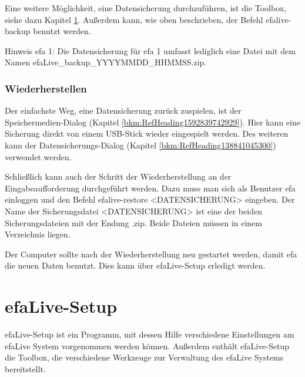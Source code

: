 \documentclass[a4paper,12pt,twoside]{article}
\begin{document}
\bigskip

Eine weitere Möglichkeit, eine Datensicherung durchzuführen, ist die
Toolbox, siehe dazu Kapitel \ref{bkm:RefHeading14181505831011}.
Außerdem kann, wie oben beschrieben, der Befehl
{\textquotedbl}efalive-backup{\textquotedbl} benutzt werden.


\bigskip

Hinweis efa 1: Die Datensicherung für efa 1 umfasst lediglich eine Datei
mit dem Namen
{\textquotedbl}efaLive\_backup\_YYYYMMDD\_HHMMSS.zip{\textquotedbl}.


\bigskip

\subsubsection{Wiederherstellen}
Der einfachste Weg, eine Datensicherung zurück zuspielen, ist der
Speichermedien-Dialog (Kapitel \ref{bkm:RefHeading1592839742929}). Hier
kann eine Sicherung direkt von einem USB-Stick wieder eingespielt
werden. Des weiteren kann der Datensicherungs-Dialog (Kapitel
\ref{bkm:RefHeading138841045300}) verwendet werden.


\bigskip

Schließlich kann auch der Schritt der Wiederherstellung an der
Eingabeaufforderung durchgeführt werden. Dazu muss man sich als
Benutzer {\textquotedbl}efa{\textquotedbl} einloggen und den Befehl
{\textquotedbl}efalive-restore
{\textless}DATENSICHERUNG{\textgreater}{\textquotedbl} eingeben. Der
Name der Sicherungsdatei {\textless}DATENSICHERUNG{\textgreater} ist
eine der beiden Sicherungsdateien mit der Endung .zip. Beide Dateien
müssen in einem Verzeichnis liegen. 


\bigskip

Der Computer sollte nach der Wiederherstellung neu gestartet werden,
damit efa die neuen Daten benutzt. Dies kann über efaLive-Setup
erledigt werden.


\bigskip

\section[efaLive{}-Setup]{efaLive-Setup}
\label{bkm:RefHeading14181505831011}efaLive-Setup ist ein Programm, mit
dessen Hilfe verschiedene Einstellungen am efaLive System vorgenommen
werden können. Außerdem enthält efaLive-Setup die
{\textquotedbl}Toolbox{\textquotedbl}, die verschiedene Werkzeuge zur
Verwaltung des efaLive Systems bereitstellt.


\bigskip
\end{document}
